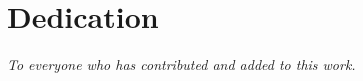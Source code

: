 \chapter*{ \textbf{\Large \sc Dedication}}
\vspace{50pt}




\begin{center}
{\centering \it To everyone who has contributed and added to this work.}
\end{center}